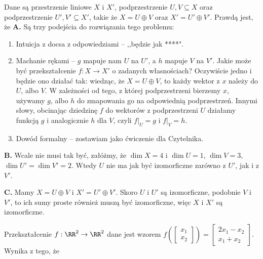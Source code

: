 \begin{solutions}
    \sol Dane są przestrzenie liniowe $X$ i $X'$, podprzestrzenie $U, V \subseteq X$ oraz podprzestrzenie $U', V' \subseteq X'$, takie że $X = U \oplus V$ oraz $X' = U' \oplus V'$. Prawdą jest, że
    \textbf{A.} Są trzy podejścia do rozwiązania tego problemu:
    \begin{enumerate}[1.]
        \item Intuicja z docsa z odpowiedziami -- ,,będzie jak ****".
        \item Machanie rękami -- $g$ mapuje nam $U$ na $U'$, a $h$ mapuje $V$ na $V'$. Jakie może być przekształcenie $f:X\to X'$ o zadanych własnościach? Oczywiście jedno i będzie ono działać tak: wiedząc, że  $X=U\oplus V$, to każdy wektor z $x$ należy do $U$, albo $V$. W zależności od tego, z której podprzestrzeni bierzemy $x$, używamy $g$, albo $h$ do zmapowania go na odpowiednią podprzestrzeń. Innymi słowy, obcinając dziedzinę $f$ do wektorów z podprzestrzeni $U$ działamy funkcją $g$ i analogicznie $h$ dla $V$, czyli $f|_U=g$ i $f|_V=h$.
        \item Dowód formalny -- zostawiam jako ćwiczenie dla Czytelnika.
    \end{enumerate}

    \textbf{B.} Wcale nie musi tak być, załóżmy, że $\dim{X}=4$ i $\dim{U}=1$, $\dim{V}=3$, $\dim{U'}=\dim{V'}=2$. Wtedy $U$ nie ma jak być izomorficzne zarówno z $U'$, jak i z $V'$.

    \textbf{C.} Mamy $X=U\oplus V$ i $X'=U'\oplus V'$. Skoro $U$ i $U'$ są izomorficzne, podobnie $V$ i $V'$, to ich sumy proste również muszą być izomorficzne, więc $X$ i $X'$ są izomorficzne.

    \sol Przekształcenie $f:\RR^2\rightarrow\RR^2$ dane jest wzorem $f\left(\begin{bmatrix}x_1\\ x_2\end{bmatrix}\right)=\begin{bmatrix}2x_1-x_2\\ x_1+x_2\end{bmatrix}$. Wynika z tego, że


\end{solutions}
